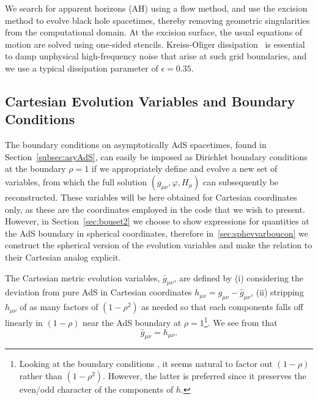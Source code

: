 \documentclass[12pt]{iopart} %
\begin{document}
We search for apparent horizons (AH) using a flow method, and use the excision method to evolve black hole spacetimes, thereby removing geometric singularities from the computational domain.
At the excision surface, the usual equations of motion are solved using one-sided stencils. 
Kreiss-Oliger dissipation~\cite{kreiss1973methods} is essential to damp unphysical high-frequency noise that arise at such grid boundaries, and we use a typical dissipation parameter of $\epsilon=0.35$.

\subsection{Cartesian Evolution Variables and Boundary Conditions}\label{subsec:cartevvarboucon}

The boundary conditions on asymptotically AdS spacetimes, found in Section~\ref{subsec:asyAdS}, can easily be imposed as Dirichlet boundary conditions at the boundary $\rho=1$ if we appropriately define and evolve a new set of variables, from which the full solution $(g_{\mu\nu},\varphi,H_\mu)$ can subsequently be reconstructed. %
These variables will be here obtained for Cartesian coordinates only, as these are the coordinates employed in the code that we wish to present. However, in Section~\ref{sec:bouset2} we choose to show expressions for quantities at the AdS boundary in spherical coordinates, therefore in~\ref{sec:sphevvarboucon} we construct the spherical version of the evolution variables and make the relation to their Cartesian analog explicit.

The Cartesian metric evolution variables, $\bar{g}_{\mu\nu}$, are defined by (i) considering the deviation from pure AdS in Cartesian coordinates $h_{\mu\nu}=g_{\mu\nu}-\hat{g}_{\mu\nu}$, (ii) stripping $h_{\mu\nu}$ of as many factors of $(1-\rho^2)$ as needed so that each components falls off linearly in $(1-\rho)$ near the AdS boundary at $\rho=1$\footnote{Looking at the boundary conditions , it seems natural to factor out $(1-\rho)$ rather than $(1-\rho^2)$. However, the latter is preferred since it preserves the even/odd character of the components of $h$.}. 
We see from  that 
\begin{equation}\label{eq:gbarcart}
\bar{g}_{\mu\nu}=h_{\mu\nu}.
\end{equation}
\end{document}
